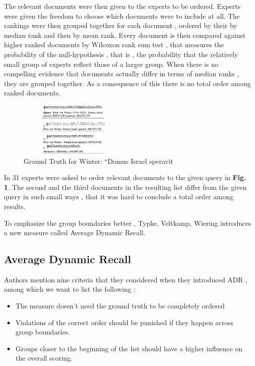 \documentclass{llncs}
\begin{document}
 		The relevant documents were then given to the experts to be ordered. Experts were given the freedom to choose which documents were to include at all. The rankings were then grouped together for each document , ordered by their by median rank and then by mean rank. Every document is then compared against higher ranked documents by Wilcoxon rank sum test , that measures the probability of the null-hypothesis , that is , the probability that the relatively small group of experts reflect those of a larger group. When there is no compelling evidence that documents actually differ in terms of median ranks , they are grouped together. As a consequence of this there is no total order among ranked documents. 

 		\begin{figure}[h!]
			\centering
			\includegraphics[width=200px,height=100px,keepaspectratio]{one_of_two_point_four_point_four}
			\caption{Ground Truth for Winter: “Domus Israel speravit \cite{two_point_four_point_four}}
		\end{figure}


 		In \cite{two_point_four_point_four} 31 experts were asked to order relevant documents to the given query in \textbf{Fig. 1}. The second and the third documents in the resulting list differ from the given query in such small ways , that it was hard to conclude a total order among results.

 		To emphasize the group boundaries better , Typke, Veltkamp, Wiering \cite{two_point_four_point_four} introduces a new measure called Average Dynamic Recall. 

		\subsection{Average Dynamic Recall}
			
			
			Authors mention nine criteria that they considered when they introduced ADR , among which we want to list the following :

			\begin{itemize}
				\item The measure doesn't need the ground truth to be completely ordered
				\item Violations of the correct order should be punished if they happen across group boundaries.
				\item Groups closer to the beginning of the list should have a higher influence on the overall scoring.
			\end{itemize}
\end{document}
